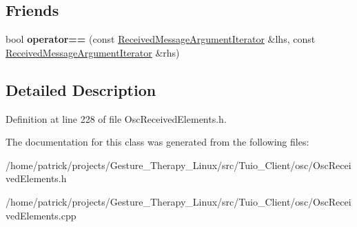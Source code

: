 \subsection*{Friends}
\begin{DoxyCompactItemize}
\item 
\mbox{\label{classosc_1_1_received_message_argument_iterator_aaff47255d903b57481f3de2ddd758dde}} 
bool {\bfseries operator==} (const \hyperlink{classosc_1_1_received_message_argument_iterator}{Received\+Message\+Argument\+Iterator} \&lhs, const \hyperlink{classosc_1_1_received_message_argument_iterator}{Received\+Message\+Argument\+Iterator} \&rhs)
\end{DoxyCompactItemize}


\subsection{Detailed Description}


Definition at line 228 of file Osc\+Received\+Elements.\+h.



The documentation for this class was generated from the following files\+:\begin{DoxyCompactItemize}
\item 
/home/patrick/projects/\+Gesture\+\_\+\+Therapy\+\_\+\+Linux/src/\+Tuio\+\_\+\+Client/osc/Osc\+Received\+Elements.\+h\item 
/home/patrick/projects/\+Gesture\+\_\+\+Therapy\+\_\+\+Linux/src/\+Tuio\+\_\+\+Client/osc/Osc\+Received\+Elements.\+cpp\end{DoxyCompactItemize}
